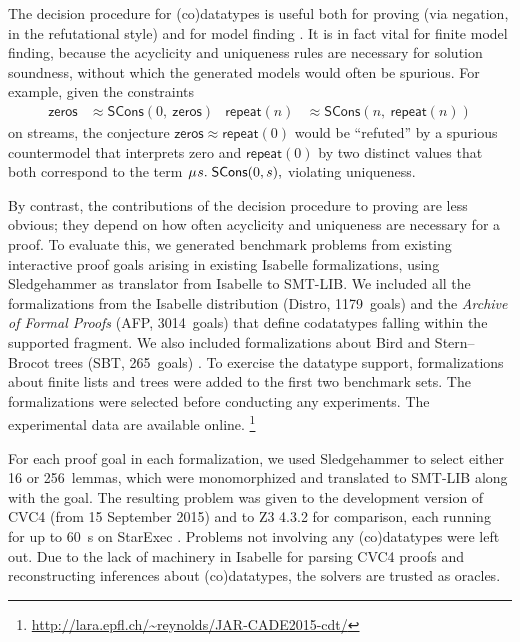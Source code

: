 \documentclass[smallcondensed,draft]{svjour3}
\newcommand\MU{\vvthinspace\mu\vvthinspace}
\newcommand\const[1]{\textsf{#1}}
\newcommand{\teq}{\approx}
\newcommand\vvthinspace{\kern+0.041667em}
\begin{document}
\newcommand\gandl{SBT}
\newcommand\HD[1]{\hbox to2em{\footnotesize\hfill\!\!\!\!#1\!\!\!\!\hfill}}

The decision procedure for (co)datatypes is useful both for proving (via
negation, in the refutational style) and for model finding
\cite{reynolds-et-al-2013,ge-de-moura-2009}.
It is in fact vital for finite model finding,
because the acyclicity and uniqueness rules are necessary for solution
soundness, without which the generated models would often be
spurious. For example, given the constraints
\begin{align*}
\const{zeros} & \teq \const{SCons}(0,\:\const{zeros})
& \const{repeat}(n) & \teq \const{SCons}(n,\:\const{repeat}(n))
\end{align*}
on streams, the conjecture
$\const{zeros} \teq \const{repeat}(0)$
would be ``refuted'' by a spurious countermodel that interprets
\const{zero} and $\const{repeat}(0)$ by two distinct
values that both correspond to the term
$\MU s.\; \const{SCons}(0, s),$
violating uniqueness.

By contrast, the contributions of the decision procedure
to proving are less obvious; they depend on how
often acyclicity and uniqueness are necessary for a proof.
To evaluate this,
we generated benchmark problems from existing interactive
proof goals arising in existing
Isabelle formalizations, using Sledgehammer \cite{blanchette-et-al-2013-smt}
as translator from Isabelle to SMT-LIB.
We
included all the formalizations from the Isabelle distribution (Distro, 1179~goals)
and the \emph{Archive of Formal Proofs} (AFP, 3014~goals) \cite{klein-et-al-afp}
that define codatatypes falling within the supported fragment. We
also included formalizations about Bird and Stern--Brocot trees (\gandl,
265~goals) \cite{gammie-lochbihler-2016}. To exercise the datatype support, formalizations about finite
lists and trees
were added to the first two benchmark sets. The formalizations were selected before
conducting any experiments. The experimental data are available
online.%
\footnote{\url{http://lara.epfl.ch/~reynolds/JAR-CADE2015-cdt/}}



For each proof goal in each formalization, we used Sledgehammer to select either 16 or
256~lemmas, which were monomorphized and translated to SMT-LIB along with the
goal. The resulting problem was given to the
development version of CVC4
(from 15 September 2015) and to
Z3 4.3.2 for comparison, each running for
up to 60~s on StarExec \cite{stump-et-al-2014-starexec}.
Problems not involving any (co)datatypes were left out.
Due to the lack of machinery in Isabelle for parsing CVC4 proofs and
reconstructing inferences about (co)datatypes, the solvers are trusted
as oracles. %
\end{document}
